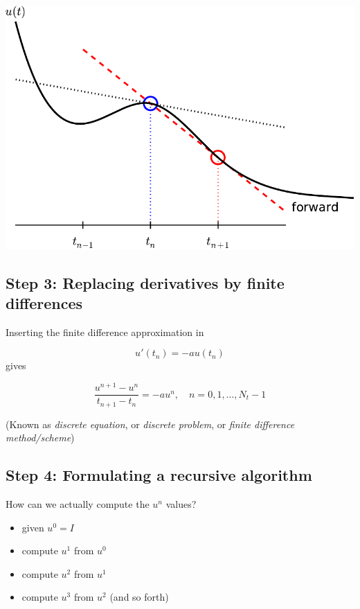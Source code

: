 \documentclass[%
oneside,                 %
final,                   %
10pt]{article}
\begin{document}
\centerline{\includegraphics[width=0.8\linewidth]{fig-alg/fd_forward.pdf}}



\subsection*{Step 3: Replacing derivatives by finite differences}

Inserting the finite difference approximation in

\[ u'(t_n) = -au(t_n)\]
gives

\begin{equation}
\frac{u^{n+1}-u^{n}}{t_{n+1}-t_n} = -au^{n},\quad n=0,1,\ldots,N_t-1
\label{decay:step3}
\end{equation}

(Known as \emph{discrete equation}, or \emph{discrete problem},
or \emph{finite difference method/scheme})

\subsection*{Step 4: Formulating a recursive algorithm}


How can we actually compute the $u^n$ values?

\begin{itemize}
  \item given $u^0=I$

  \item compute $u^1$ from $u^0$

  \item compute $u^2$ from $u^1$

  \item compute $u^3$ from $u^2$ (and so forth)
\end{itemize}
\end{document}
